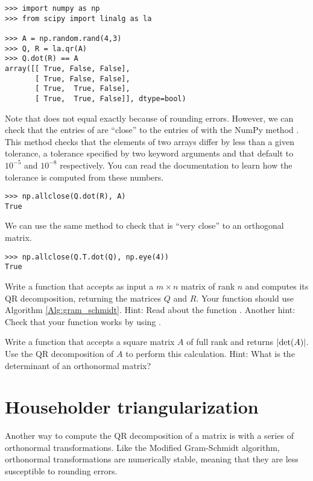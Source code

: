 \begin{lstlisting}
>>> import numpy as np
>>> from scipy import linalg as la

>>> A = np.random.rand(4,3)
>>> Q, R = la.qr(A)
>>> Q.dot(R) == A                      
array([[ True, False, False],
       [ True, False, False],
       [ True,  True, False],
       [ True,  True, False]], dtype=bool)
\end{lstlisting}
 Note that  does not equal  exactly because of rounding errors. 
 However, we can check that the entries of  are ``close'' to the entries of  with the NumPy method . 
 This method checks that the elements of two arrays differ by less than a given tolerance, a tolerance specified by two keyword arguments  and  that default to $10^{-5}$ and $10^{-8}$ respectively. 
 You can read the documentation to learn how the tolerance is computed from these numbers.
\begin{lstlisting}
>>> np.allclose(Q.dot(R), A) 
True
\end{lstlisting}
We can use the same method to check that  is ``very close'' to an orthogonal matrix.
\begin{lstlisting}
>>> np.allclose(Q.T.dot(Q), np.eye(4)) 
True
\end{lstlisting}


\begin{problem}
\label{prob:QR}
Write a function that accepts as input a $m \times n$ matrix of rank $n$ and computes its QR decomposition, returning the matrices $Q$ and $R$. 
Your function should use Algorithm \ref{Alg:gram_schmidt}. 
Hint: Read about the function .
Another hint: Check that your function works by using .
\end{problem}

\begin{problem}
Write a function that accepts a square matrix $A$ of full rank and returns $\left\lvert\det(A)\right\rvert$. 
Use the QR decomposition of $A$ to perform this calculation.
Hint: What is the determinant of an orthonormal matrix?
\end{problem}

\section*{Householder triangularization}
Another way to compute the QR decomposition of a matrix is with a series of orthonormal transformations. 
Like the Modified Gram-Schmidt algorithm, orthonormal transformations are numerically stable, meaning that they are less susceptible to rounding errors.


